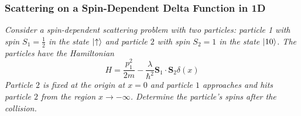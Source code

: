 \documentclass[11pt, a4paper]{article}
\renewcommand{\vec}[1]{\bm{#1}} %
\newcommand{\ua}{\uparrow}  %
\begin{document}
\subsubsection{Scattering on a Spin-Dependent Delta Function in 1D}
\textit{Consider a spin-dependent scattering problem with two particles: particle 1 with spin $ S_{1} = \frac{1}{2} $ in the state $ \ket{\ua} $ and particle $ 2 $ with spin $ S_{2} = 1 $ in the state $ \ket{10} $. The particles have the Hamiltonian}
\begin{equation*}
	H = \frac{p_{1}^{2}}{2m} - \frac{\lambda}{\hbar^{2}}\vec{S}_{1}\cdot \vec{S}_{2}\delta(x)
\end{equation*}
\textit{Particle $ 2 $ is fixed at the origin at $ x = 0 $ and particle $ 1 $ approaches and hits particle $ 2 $ from the region $ x \to -\infty $. Determine the particle's spins after the collision.}
\end{document}

